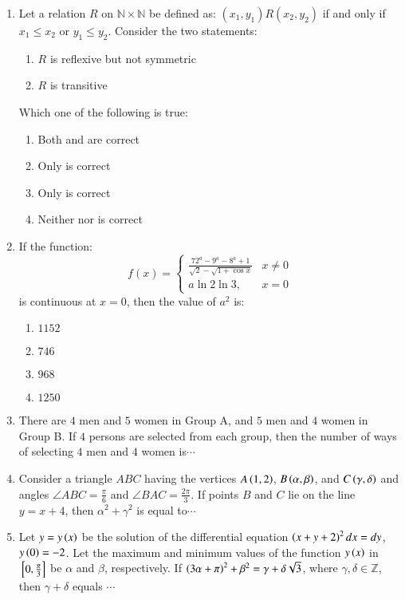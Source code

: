 \documentclass[journal,12pt,twocolumn]{IEEEtran}
\theoremstyle{remark}
\begin{document}
\begin{enumerate}[start=16]
    \item Let a relation $R$ on $\mathbb{N} \times \mathbb{N}$ be defined as: $(x_1, y_1) R (x_2, y_2)$ if and only if $x_1 \leq x_2$ or $y_1 \leq y_2$. Consider the two statements:
    \begin{enumerate}
        \item $R$ is reflexive but not symmetric
        \item $R$ is transitive
    \end{enumerate}
    Which one of the following is true:
    \begin{enumerate}
        \item Both  and  are correct
        \item Only  is correct
        \item Only  is correct
        \item Neither  nor  is correct
    \end{enumerate}

    \item If the function:
    $$
    f(x) = 
    \begin{cases}
    \frac{72^a-9^a-8^a+1}{\sqrt{2}-\sqrt{1+\cos x}} &  x \neq 0 \\
    a\ln{2}\ln{3}, &  x = 0
    \end{cases}
    $$
    is continuous at $x = 0$, then the value of $a^2$ is:
    \begin{enumerate}
        \item $1152$
        \item $746$
        \item $968$
        \item $1250$
    \end{enumerate}

    \item There are $4$ men and $5$ women in Group A, and $5$ men and $4$ women in Group B. If $4$ persons are selected from each group, then the number of ways of selecting $4$ men and $4$ women is$\cdots$
    

    \item Consider a triangle $ABC$ having the vertices $A\left(1, 2\right)$, $B\left(\alpha, \beta\right)$, and $C\left(\gamma, \delta\right)$ and angles $\angle ABC = \frac{\pi}{6}$ and $\angle BAC = \frac{2\pi}{3}$. If points $B$ and $C$ lie on the line $y = x + 4$, then $\alpha^2 + \gamma^2$ is equal to$\cdots$
    

    \item Let $y = y\left(x\right)$ be the solution of the differential equation $\left(x + y + 2\right)^2  dx = dy$, $y\left(0\right) = -2$. Let the maximum and minimum values of the function $y\left(x\right)$ in ${}\left[0, \frac{\pi}{3}\right]$ be $\alpha$ and $\beta$, respectively. If $\left(3\alpha + \pi\right)^2 + \beta^2 = \gamma + \delta\sqrt{3}$, where $\gamma, \delta \in \mathbb{Z}$, then $\gamma + \delta$ equals $\cdots$
    

\end{enumerate}
\end{document}
